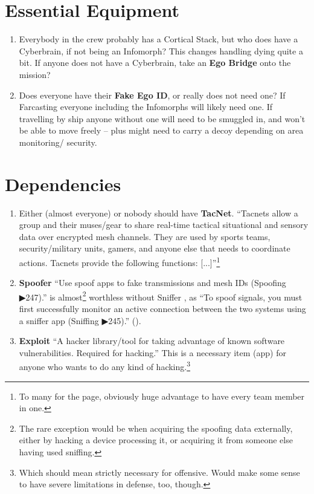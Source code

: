 \section{Essential Equipment}

\begin{enumerate}
    \item Everybody in the crew probably has a \gls{Cortical Stack}, but who does have a \gls{Cyberbrain}, if not being an Infomorph? This changes handling dying quite a bit. If anyone does not have a Cyberbrain, take an \textbf{\gls{Ego Bridge}} onto the mission?

    \item Does everyone have their \textbf{\gls{Fake Ego ID}}, or really does not need one? If Farcasting everyone including the Infomorphs will likely need one. If travelling by ship anyone without one will need to be smuggled in, and won't be able to move freely -- plus might need to carry a decoy depending on area monitoring/ security.
\end{enumerate}


\section{Dependencies}

\begin{enumerate}
    \item Either (almost everyone) or nobody should have \textbf{TacNet}. “Tacnets allow a group and their muses/gear to share real-time tactical situational and sensory data over encrypted mesh channels. They are used by sports teams, security/military units, gamers, and anyone else that needs to coordinate actions. Tacnets provide the following functions: [...]”\footnote{To many for the page, obviously huge advantage to have every team member in one.} \citep[pg. 327]{ep2e_1.1_2019}

    \item \textbf{Spoofer} “Use spoof apps to fake transmissions and mesh IDs (Spoofing ▶247).” is almost\footnote{The rare exception would be when acquiring the spoofing data externally, either by hacking a device processing it, or acquiring it from someone else having used sniffing.} worthless without Sniffer \citep[pg. 326]{ep2e_1.1_2019}, as “To spoof signals, you must first successfully monitor an active connection between the two systems using a sniffer app (Sniffing ▶245).” (\citep[pg. 247]{ep2e_1.1_2019}).\citep[pg. 326]{ep2e_1.1_2019}

    \item \textbf{Exploit} “A hacker library/tool for taking advantage of known software vulnerabilities. Required for hacking.” \citep[pg. 326]{ep2e_1.1_2019} This is a necessary item (app) for anyone who wants to do any kind of hacking.\footnote{Which should mean strictly necessary for offensive. Would make some sense to have severe limitations in defense, too, though.}
\end{enumerate}


